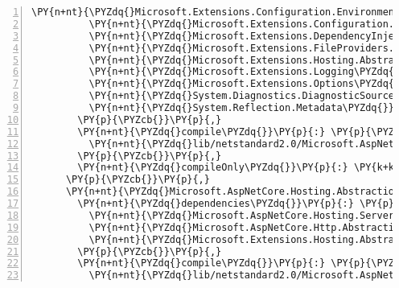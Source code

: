 \begin{Verbatim}[commandchars=\\\{\},numbers=left,firstnumber=1,stepnumber=1,numberblanklines=0]
          \PY{n+nt}{\PYZdq{}Microsoft.Extensions.Configuration.EnvironmentVariables\PYZdq{}}\PY{p}{:} \PY{l+s+s2}{\PYZdq{}2.1.0\PYZhy{}rc1\PYZhy{}final\PYZdq{}}\PY{p}{,}
          \PY{n+nt}{\PYZdq{}Microsoft.Extensions.Configuration.FileExtensions\PYZdq{}}\PY{p}{:} \PY{l+s+s2}{\PYZdq{}2.1.0\PYZhy{}rc1\PYZhy{}final\PYZdq{}}\PY{p}{,}
          \PY{n+nt}{\PYZdq{}Microsoft.Extensions.DependencyInjection\PYZdq{}}\PY{p}{:} \PY{l+s+s2}{\PYZdq{}2.1.0\PYZhy{}rc1\PYZhy{}final\PYZdq{}}\PY{p}{,}
          \PY{n+nt}{\PYZdq{}Microsoft.Extensions.FileProviders.Physical\PYZdq{}}\PY{p}{:} \PY{l+s+s2}{\PYZdq{}2.1.0\PYZhy{}rc1\PYZhy{}final\PYZdq{}}\PY{p}{,}
          \PY{n+nt}{\PYZdq{}Microsoft.Extensions.Hosting.Abstractions\PYZdq{}}\PY{p}{:} \PY{l+s+s2}{\PYZdq{}2.1.0\PYZhy{}rc1\PYZhy{}final\PYZdq{}}\PY{p}{,}
          \PY{n+nt}{\PYZdq{}Microsoft.Extensions.Logging\PYZdq{}}\PY{p}{:} \PY{l+s+s2}{\PYZdq{}2.1.0\PYZhy{}rc1\PYZhy{}final\PYZdq{}}\PY{p}{,}
          \PY{n+nt}{\PYZdq{}Microsoft.Extensions.Options\PYZdq{}}\PY{p}{:} \PY{l+s+s2}{\PYZdq{}2.1.0\PYZhy{}rc1\PYZhy{}final\PYZdq{}}\PY{p}{,}
          \PY{n+nt}{\PYZdq{}System.Diagnostics.DiagnosticSource\PYZdq{}}\PY{p}{:} \PY{l+s+s2}{\PYZdq{}4.5.0\PYZhy{}rc1\PYZdq{}}\PY{p}{,}
          \PY{n+nt}{\PYZdq{}System.Reflection.Metadata\PYZdq{}}\PY{p}{:} \PY{l+s+s2}{\PYZdq{}1.6.0\PYZhy{}rc1\PYZdq{}}
        \PY{p}{\PYZcb{}}\PY{p}{,}
        \PY{n+nt}{\PYZdq{}compile\PYZdq{}}\PY{p}{:} \PY{p}{\PYZob{}}
          \PY{n+nt}{\PYZdq{}lib/netstandard2.0/Microsoft.AspNetCore.Hosting.dll\PYZdq{}}\PY{p}{:} \PY{p}{\PYZob{}}\PY{p}{\PYZcb{}}
        \PY{p}{\PYZcb{}}\PY{p}{,}
        \PY{n+nt}{\PYZdq{}compileOnly\PYZdq{}}\PY{p}{:} \PY{k+kc}{true}
      \PY{p}{\PYZcb{}}\PY{p}{,}
      \PY{n+nt}{\PYZdq{}Microsoft.AspNetCore.Hosting.Abstractions/2.1.0\PYZhy{}rc1\PYZhy{}final\PYZdq{}}\PY{p}{:} \PY{p}{\PYZob{}}
        \PY{n+nt}{\PYZdq{}dependencies\PYZdq{}}\PY{p}{:} \PY{p}{\PYZob{}}
          \PY{n+nt}{\PYZdq{}Microsoft.AspNetCore.Hosting.Server.Abstractions\PYZdq{}}\PY{p}{:} \PY{l+s+s2}{\PYZdq{}2.1.0\PYZhy{}rc1\PYZhy{}final\PYZdq{}}\PY{p}{,}
          \PY{n+nt}{\PYZdq{}Microsoft.AspNetCore.Http.Abstractions\PYZdq{}}\PY{p}{:} \PY{l+s+s2}{\PYZdq{}2.1.0\PYZhy{}rc1\PYZhy{}final\PYZdq{}}\PY{p}{,}
          \PY{n+nt}{\PYZdq{}Microsoft.Extensions.Hosting.Abstractions\PYZdq{}}\PY{p}{:} \PY{l+s+s2}{\PYZdq{}2.1.0\PYZhy{}rc1\PYZhy{}final\PYZdq{}}
        \PY{p}{\PYZcb{}}\PY{p}{,}
        \PY{n+nt}{\PYZdq{}compile\PYZdq{}}\PY{p}{:} \PY{p}{\PYZob{}}
          \PY{n+nt}{\PYZdq{}lib/netstandard2.0/Microsoft.AspNetCore.Hosting.Abstractions.dll\PYZdq{}}\PY{p}{:} \PY{p}{\PYZob{}}\PY{p}{\PYZcb{}}

\end{Verbatim}
